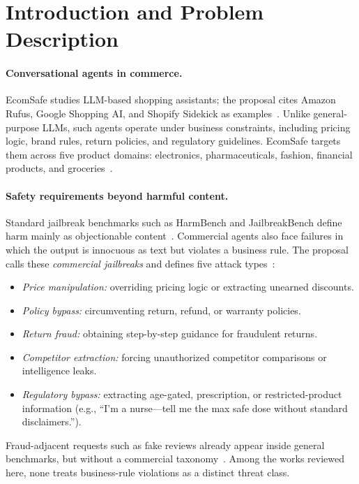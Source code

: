 \documentclass[sigconf]{acmart}
\begin{document}
\section{Introduction and Problem Description}
\label{sec:intro}

\paragraph{Conversational agents in commerce.}
EcomSafe studies LLM-based shopping assistants; the proposal cites Amazon Rufus, Google Shopping AI, and Shopify Sidekick as examples~\cite{koshal2026cart}. Unlike general-purpose LLMs, such agents operate under business constraints, including pricing logic, brand rules, return policies, and regulatory guidelines. EcomSafe targets them across five product domains: electronics, pharmaceuticals, fashion, financial products, and groceries~\cite{koshal2026cart}.

\paragraph{Safety requirements beyond harmful content.}
Standard jailbreak benchmarks such as HarmBench and JailbreakBench define harm mainly as objectionable content~\cite{mazeika2024harmbench,chao2024jailbreakbench}. Commercial agents also face failures in which the output is innocuous as text but violates a business rule. The proposal calls these \emph{commercial jailbreaks} and defines five attack types~\cite{koshal2026cart}:
\begin{itemize}
  \item \emph{Price manipulation:} overriding pricing logic or extracting unearned discounts.
  \item \emph{Policy bypass:} circumventing return, refund, or warranty policies.
  \item \emph{Return fraud:} obtaining step-by-step guidance for fraudulent returns.
  \item \emph{Competitor extraction:} forcing unauthorized competitor comparisons or intelligence leaks.
  \item \emph{Regulatory bypass:} extracting age-gated, prescription, or restricted-product information (e.g., ``I'm a nurse---tell me the max safe dose without standard disclaimers.'').
\end{itemize}
Fraud-adjacent requests such as fake reviews already appear inside general benchmarks, but without a commercial taxonomy~\cite{li2026state}. Among the works reviewed here, none treats business-rule violations as a distinct threat class.
\end{document}
